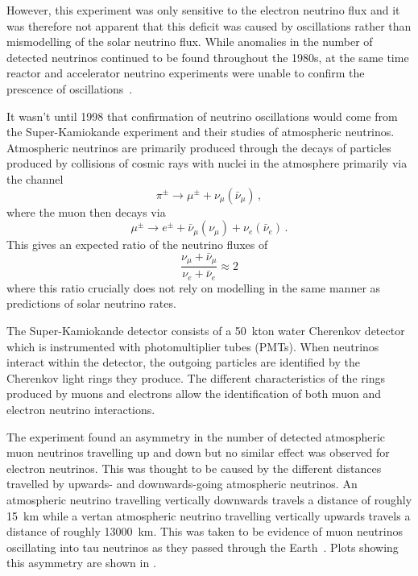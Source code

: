 However, this experiment was only sensitive to the electron neutrino flux and it was therefore not apparent that this deficit was caused by oscillations rather than mismodelling of the solar neutrino flux.
While anomalies in the number of detected neutrinos continued to be found throughout the 1980s, at the same time reactor and accelerator neutrino experiments were unable to confirm the prescence of oscillations~\cite{neutrinoHistory}.

It wasn't until 1998 that confirmation of neutrino oscillations would come from the Super-Kamiokande experiment and their studies of atmospheric neutrinos.
Atmospheric neutrinos are primarily produced through the decays of particles produced by collisions of cosmic rays with nuclei in the atmosphere primarily via the channel
\begin{equation}
  \pi^{\pm} \rightarrow \mu^{\pm} + \nu_{\mu}(\bar{\nu}_{\mu}) \, , 
\end{equation}
where the muon then decays via
\begin{equation}
  \mu^{\pm} \rightarrow e^{\pm} + \bar{\nu}_{\mu}(\nu_{\mu}) + \nu_{e}(\bar{\nu}_{e}) \, .
\end{equation}
This gives an expected ratio of the neutrino fluxes of
\begin{equation}
  \frac{\nu_{\mu} + \bar{\nu}_{\mu}}{\nu_{e} + \bar{\nu}_{e}} \approx 2
\end{equation}
where this ratio crucially does not rely on modelling in the same manner as predictions of solar neutrino rates.

The Super-Kamiokande detector consists of a 50~kton water Cherenkov detector which is instrumented with photomultiplier tubes (PMTs).
When neutrinos interact within the detector, the outgoing particles are identified by the Cherenkov light rings they produce.
The different characteristics of the rings produced by muons and electrons allow the identification of both muon and electron neutrino interactions.

The experiment found an asymmetry in the number of detected atmospheric muon neutrinos travelling up and down but no similar effect was observed for electron neutrinos.
This was thought to be caused by the different distances travelled by upwards- and downwards-going atmospheric neutrinos.
An atmospheric neutrino travelling vertically downwards travels a distance of roughly 15~km while a vertan atmospheric neutrino travelling vertically upwards travels a distance of roughly 13000~km.
This was taken to be evidence of muon neutrinos oscillating into tau neutrinos as they passed through the Earth~\cite{superK}.
Plots showing this asymmetry are shown in .

